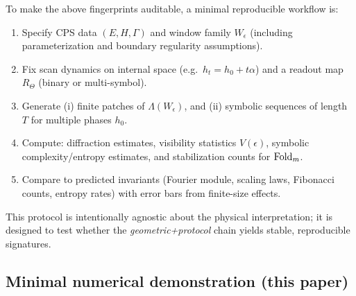 To make the above fingerprints auditable, a minimal reproducible workflow is:
\begin{enumerate}[label=\textbf{P\arabic*.},leftmargin=*,itemsep=2pt]
  \item Specify CPS data $(E,H,\Gamma)$ and window family $W_\epsilon$ (including parameterization and boundary regularity assumptions).
  \item Fix scan dynamics on internal space (e.g.\ $h_t=h_0+t\alpha$) and a readout map $R_\Theta$ (binary or multi-symbol).
  \item Generate (i) finite patches of $\Lambda(W_\epsilon)$, and (ii) symbolic sequences of length $T$ for multiple phases $h_0$.
  \item Compute: diffraction estimates, visibility statistics $V(\epsilon)$, symbolic complexity/entropy estimates, and stabilization counts for $\mathrm{Fold}_m$.
  \item Compare to predicted invariants (Fourier module, scaling laws, Fibonacci counts, entropy rates) with error bars from finite-size effects.
\end{enumerate}

This protocol is intentionally agnostic about the physical interpretation; it is designed to test whether the \emph{geometric+protocol} chain yields stable, reproducible signatures.

\subsection{Minimal numerical demonstration (this paper)}\label{sec:falsifiability:demo}

